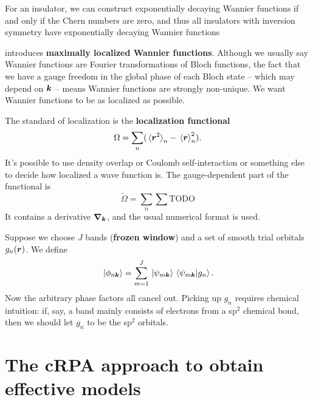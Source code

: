 \documentclass[hyperref, a4paper, 12pt]{report}
\newcommand*{\concept}[1]{{\textbf{#1}}}
\begin{document}
For an insulator,
we can construct exponentially decaying Wannier functions 
if and only if the Chern numbers are zero, 
and thus all insulators with inversion symmetry 
have exponentially decaying Wannier functions \cite{brouder2007exponential}

\cite{marzari2012maximally} introduces \concept{maximally localized Wannier functions}.
Although we usually say Wannier functions are Fourier transformations of Bloch functions,
the fact that we have a gauge freedom in the global phase of each Bloch state
-- which may depend on $\vb*{k}$ --  
means Wannier functions are strongly non-unique.
We want Wannier functions to be as localized as possible. 

The standard of localization is the \concept{localization functional}
\begin{equation}
    \Omega = \sum_n (\expval*{\vb*{r}^2}_n - \expval*{\vb*{r}}_n^2).
\end{equation}
It's possible to use density overlap or Coulomb self-interaction 
or something else 
to decide how localized a wave function is. 
The gauge-dependent part of the functional 
is 
\begin{equation}
    \tilde{\Omega} = \sum_n \sum_{} \text{TODO}
\end{equation}
It contains a derivative $\grad_{\vb*{k}}$,
and the usual numerical format is used. 


Suppose we choose $J$ bands (\concept{frozen window}) and a set of smooth trial orbitals $g_n(\vb*{r})$.
We define 
\begin{equation}
    \ket*{\phi_{n \vb*{k}}} = \sum_{m = 1}^J \ket*{\psi_{m \vb*{k}}} \braket*{\psi_{m \vb*{k}}}{g_n}.
\end{equation}
Now the arbitrary phase factors all cancel out. 
Picking up $g_n$ requires chemical intuition: 
if, say, a band mainly consists of electrons from a sp$^2$ chemical bond, 
then we should let $g_n$ to be the sp$^2$ orbitals. 

\section{The cRPA approach to obtain effective models}
\end{document}
